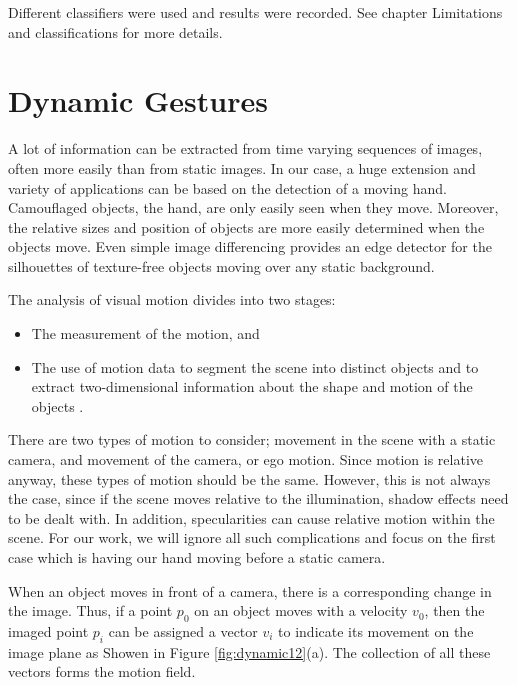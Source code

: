 \bigskip
 
Different classifiers were used and results were recorded. See chapter Limitations and classifications for more details.
\bigskip



\section{Dynamic Gestures}
A lot of information can be extracted from time varying sequences of images, often more easily than from static images. In our case, a huge extension and variety of applications can be based on the detection of a moving hand. Camouflaged objects, the hand, are only easily seen when they move. Moreover, the relative sizes and position of objects are more easily determined when the objects move. Even simple image differencing provides an edge detector for the silhouettes of texture-free objects moving over any static background.\bigskip

The analysis of visual motion divides into two stages:
\begin{itemize}
\item The measurement of the motion, and 
\item The use of motion data to segment the scene into distinct objects and to extract two-dimensional information about the shape and motion of the objects \cite{dynamic1}.
\end{itemize}
\bigskip

There are two types of motion to consider; movement in the scene with a static camera, and movement of the camera, or ego motion. Since motion is relative anyway, these types of motion should be the same. However, this is not always the case, since if the scene moves relative to the illumination, shadow effects need to be dealt with. In addition, specularities can cause relative motion within the scene. For our work, we will ignore all such complications and focus on the first case which is having our hand moving before a static camera.\bigskip

When an object moves in front of a camera, there is a corresponding change in the image. Thus, if a point $p_0$ on an object moves with a velocity $v_0$, then the imaged point $p_i$ can be assigned a vector $v_i$ to indicate its movement on the image plane as Showen in Figure \ref{fig:dynamic12}(a). The collection of all these vectors forms the motion field.

